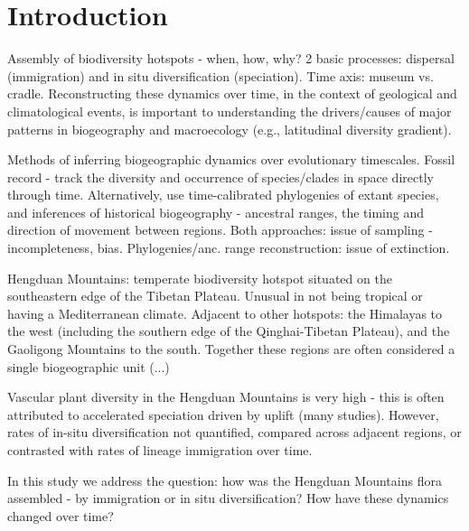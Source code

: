 \section{Introduction}

Assembly of biodiversity hotspots - when, how, why? 2 basic processes: dispersal (immigration) and in situ diversification (speciation). Time axis: museum vs. cradle. Reconstructing these dynamics over time, in the context of geological and climatological events, is important to understanding the drivers/causes of major patterns in biogeography and macroecology (e.g., latitudinal diversity gradient).

Methods of inferring biogeographic dynamics over evolutionary timescales. Fossil record - track the diversity and occurrence of species/clades in space directly through time. Alternatively, use time-calibrated phylogenies of extant species, and inferences of historical biogeography - ancestral ranges, the timing and direction of movement between regions. Both approaches: issue of sampling - incompleteness, bias. Phylogenies/anc. range reconstruction: issue of extinction.

Hengduan Mountains: temperate biodiversity hotspot situated on the southeastern edge of the Tibetan Plateau. Unusual in not being tropical or having a Mediterranean climate. Adjacent to other hotspots: the Himalayas to the west (including the southern edge of the Qinghai-Tibetan Plateau), and the Gaoligong Mountains to the south. Together these regions are often considered a single biogeographic unit (...)

Vascular plant diversity in the Hengduan Mountains is very high - this is often attributed to accelerated speciation driven by uplift (many studies). However, rates of in-situ diversification not quantified, compared across adjacent regions, or contrasted with rates of lineage immigration over time.

In this study we address the question: how was the Hengduan Mountains flora assembled - by immigration or in situ diversification? How have these dynamics changed over time?